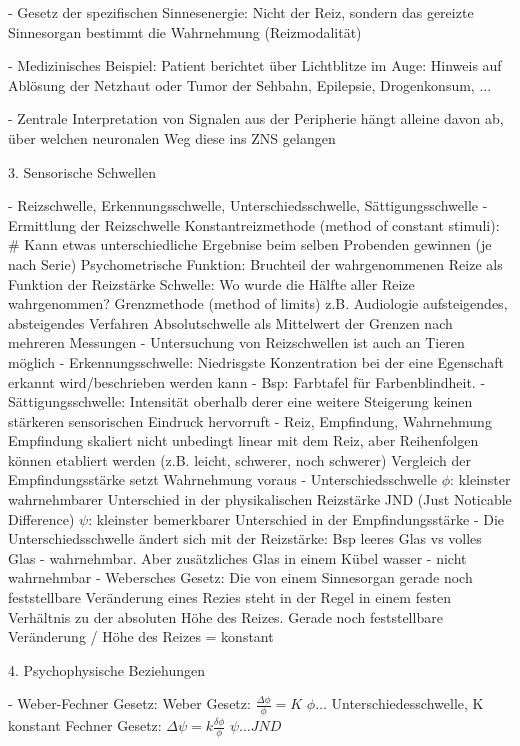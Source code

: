 - Gesetz der spezifischen Sinnesenergie:
    Nicht der Reiz, sondern das gereizte Sinnesorgan bestimmt die Wahrnehmung (Reizmodalität)
    
- Medizinisches Beispiel: Patient berichtet über Lichtblitze im Auge: Hinweis auf Ablösung der Netzhaut oder Tumor der Sehbahn, Epilepsie, Drogenkonsum, ...
    
- Zentrale Interpretation von Signalen aus der Peripherie hängt alleine davon ab, über welchen neuronalen Weg diese ins ZNS gelangen
    


3. Sensorische Schwellen

- Reizschwelle, Erkennungsschwelle, Unterschiedsschwelle, Sättigungsschwelle
- Ermittlung der Reizschwelle
    Konstantreizmethode (method of constant stimuli): #
        Kann etwas unterschiedliche Ergebnise beim selben Probenden gewinnen (je nach Serie)
        Psychometrische Funktion: Bruchteil der wahrgenommenen Reize als Funktion der Reizstärke
        Schwelle: Wo wurde die Hälfte aller Reize wahrgenommen?
    Grenzmethode (method of limits)
        z.B. Audiologie
        aufsteigendes, absteigendes Verfahren
        Absolutschwelle als Mittelwert der Grenzen nach mehreren Messungen
- Untersuchung von Reizschwellen ist auch an Tieren möglich
- Erkennungsschwelle: Niedrisgste Konzentration bei der eine Egenschaft erkannt wird/beschrieben werden kann
- Bsp: Farbtafel für Farbenblindheit.
- Sättigungsschwelle: Intensität oberhalb derer eine weitere Steigerung keinen stärkeren sensorischen Eindruck hervorruft
- Reiz, Empfindung, Wahrnehmung
    Empfindung skaliert nicht unbedingt linear mit dem Reiz, aber Reihenfolgen können etabliert werden (z.B. leicht, schwerer, noch schwerer)
    Vergleich der Empfindungsstärke setzt Wahrnehmung voraus
- Unterschiedsschwelle \(\phi\): kleinster wahrnehmbarer Unterschied in der physikalischen Reizstärke
    JND (Just Noticable Difference) \(\psi\): kleinster bemerkbarer Unterschied in der Empfindungsstärke
- Die Unterschiedsschwelle ändert sich mit der Reizstärke: Bsp leeres Glas vs volles Glas - wahrnehmbar. Aber zusätzliches Glas in einem Kübel wasser - nicht wahrnehmbar
- Webersches Gesetz: Die von einem Sinnesorgan gerade noch feststellbare Veränderung eines Rezies steht in der Regel in einem festen Verhältnis zu der absoluten Höhe des Reizes.
    Gerade noch feststellbare Veränderung / Höhe des Reizes = konstant
    
4. Psychophysische Beziehungen

- Weber-Fechner Gesetz: 
    Weber Gesetz: \(\frac{\Delta \phi}{\phi} = K\)    
    \(\phi \dots\) Unterschiedesschwelle, K konstant
    Fechner Gesetz: \(\Delta \psi = k\frac{\delta \phi}{\phi}\)
    \(\psi \dots JND\)
    
